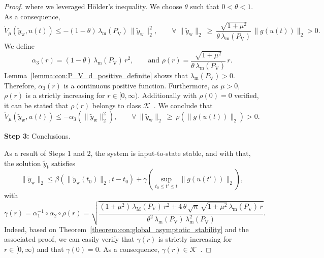 \begin{proof}
    where we leveraged Hölder's inequality. We choose $\theta$ such that $0 < \theta < 1$.
    As a consequence,
    \begin{equation}
        \dot{V}_\mu(\tilde{y}_\mathrm{w}, u(t)) \leq -(1-\theta) \, \lambda_\mathrm{m}\left(P_{\dot{\mathrm{V}}} \right) \, \lVert \tilde{y}_\mathrm{w} \rVert_2^2, %
        \qquad
        \forall \: \lVert \tilde{y}_\mathrm{w} \rVert_2 \: \geq \: \frac{\sqrt{1+\mu^2}}{\theta \, \lambda_\mathrm{m}\left(P_{\dot{\mathrm{V}}} \right)} \, \lVert g(u(t)) \rVert_2  > 0.
    \end{equation}
    We define
    \begin{equation}
        \alpha_3(r) = (1-\theta) \, \lambda_\mathrm{m}\left(P_{\dot{\mathrm{V}}} \right) \, r^2,
        \qquad
        \text{and }
        \rho(r) = \frac{\sqrt{1+\mu^2}}{\theta \, \lambda_\mathrm{m}\left(P_{\dot{\mathrm{V}}} \right)} \, r.
    \end{equation}
    Lemma~\ref{lemma:con:P_V_d_positive_definite} shows that $\lambda_\mathrm{m}\left(P_{\dot{\mathrm{V}}} \right) > 0$. Therefore, $\alpha_3(r)$ is a continuous positive function. Furthermore, as $\mu > 0$, $\rho(r)$ is a strictly increasing for $r \in [0, \infty)$. Additionally with $\rho(0) = 0$ verified, it can be stated that $\rho(r)$ belongs to class $\mathcal{K}$~\cite{khalil2002nonlinear}.
    We conclude that
    \begin{equation}
        \dot{V}_\mu(\tilde{y}_\mathrm{w}, u(t)) \leq - \alpha_3 \left (\lVert \tilde{y}_\mathrm{w} \rVert_2^2 \right ),
        \qquad
        \forall \: \lVert \tilde{y}_\mathrm{w} \rVert_2 \: \geq \: \rho \left ( \lVert g(u(t)) \rVert_2 \right )  > 0.
    \end{equation}

    \textbf{Step 3:} Conclusions.

    As a result of Steps 1 and 2, the system is input-to-state stable, and with that, the solution $\tilde{y}_\mathrm{t}$ satisfies~\cite{khalil2002nonlinear}
    \begin{equation}
        \lVert \tilde{y}_\mathrm{w} \rVert_2 \leq \beta \left (\lVert \tilde{y}_\mathrm{w}(t_0) \rVert_2, t-t_0 \right ) + \gamma \left ( \sup_{t_0 \leq t' \leq t} \lVert g(u(t')) \rVert_2 \right ),
    \end{equation}
    with
    \begin{equation}
        \gamma(r) = \alpha_1^{-1} \circ \alpha_2 \circ \rho(r) = \sqrt{\frac{(1+\mu^2) \, \lambda_\mathrm{M}(P_\mathrm{V}) \, r^2 + 4 \, \theta \, \sqrt{n} \, \sqrt{1+\mu^2} \, \lambda_\mathrm{m}(P_{\dot{\mathrm{V}}}) \, r}{\theta^2 \, \lambda_\mathrm{m}(P_\mathrm{V}) \, \lambda_\mathrm{m}^2(P_{\dot{\mathrm{V}}})}}.
    \end{equation}
    Indeed, based on Theorem~\ref{theorem:con:global_asymptotic_stability} and the associated proof, we can easily verify that $\gamma(r)$ is strictly increasing for $r \in [0, \infty)$ and that $\gamma(0) = 0$. As a consequence, $\gamma(r) \in \mathcal{K}$~\cite{khalil2002nonlinear}.
\end{proof}